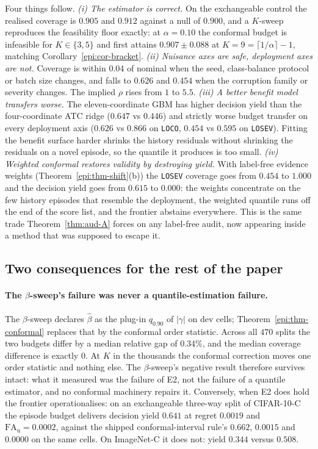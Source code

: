 Four things follow.
\emph{(i) The estimator is correct.} On the exchangeable control the realised coverage is
$0.905$ and $0.912$ against a null of $0.900$, and a $K$-sweep reproduces the feasibility floor
exactly: at $\alpha=0.10$ the conformal budget is infeasible for $K\in\{3,5\}$ and first attains
$0.907\pm0.088$ at $K=9=\lceil1/\alpha\rceil-1$, matching Corollary~\ref{epi:cor-bracket}.
\emph{(ii) Nuisance axes are safe, deployment axes are not.} Coverage is within $0.04$ of nominal
when the seed, class-balance protocol or batch size changes, and falls to $0.626$ and $0.454$ when
the corruption family or severity changes. The implied $\rho$ rises from $1$ to $5.5$.
\emph{(iii) A better benefit model transfers worse.} The eleven-coordinate GBM has higher decision
yield than the four-coordinate ATC ridge ($0.647$ vs $0.446$) and strictly worse budget transfer on
every deployment axis ($0.626$ vs $0.866$ on \texttt{LOCO}, $0.454$ vs $0.595$ on \texttt{LOSEV}).
Fitting the benefit surface harder shrinks the history residuals without shrinking the residuals on
a novel episode, so the quantile it produces is too small.
\emph{(iv) Weighted conformal restores validity by destroying yield.} With label-free evidence
weights (Theorem~\ref{epi:thm-shift}(b)) the \texttt{LOSEV} coverage goes from $0.454$ to $1.000$
and the decision yield goes from $0.615$ to $0.000$: the weights concentrate on the few history
episodes that resemble the deployment, the weighted quantile runs off the end of the score list, and
the frontier abstains everywhere. This is the same trade Theorem~\ref{thm:aud-A} forces on any
label-free audit, now appearing inside a method that was supposed to escape it.

\subsection{Two consequences for the rest of the paper}

\paragraph{The $\beta$-sweep's failure was never a quantile-estimation failure.}
The $\beta$-sweep declares $\widehat\beta$ as the plug-in $q_{0.90}$ of $|\gamma|$ on dev cells;
Theorem~\ref{epi:thm-conformal} replaces that by the conformal order statistic. Across all $470$
splits the two budgets differ by a median relative gap of $0.34\%$, and the median coverage
difference is exactly $0$. At $K$ in the thousands the conformal correction moves one order
statistic and nothing else. The $\beta$-sweep's negative result therefore survives intact: what it
measured was the failure of E2, not the failure of a quantile estimator, and no conformal
machinery repairs it. Conversely, when E2 does hold the frontier operationalises: on an exchangeable
three-way split of CIFAR-10-C the episode budget delivers decision yield $0.641$ at regret $0.0019$
and $\mathrm{FA}_{\mathrm u}=0.0002$, against the shipped conformal-interval rule's $0.662$,
$0.0015$ and $0.0000$ on the same cells. On ImageNet-C it does not: yield $0.344$ versus $0.508$.

